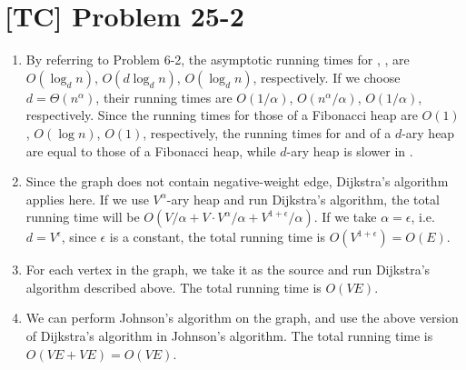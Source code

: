 \documentclass[a4paper,11pt,twocolumn]{article}
\begin{document}
  \section{[TC] Problem 25-2}
  \begin{enumerate}
  	\item By referring to Problem 6-2, the asymptotic running times for , ,  are $O(\log_d n)$, $O(d \log_d n)$, $O(\log_d n )$, respectively. If we choose $d = \Theta(n^{\alpha})$, their running times are $O(1/\alpha)$, $O(n^{\alpha}/\alpha)$, $O(1/\alpha)$, respectively. Since the running times for those of a Fibonacci heap are $O(1)$, $O(\log n)$, $O(1)$, respectively, the running times for  and  of a $d$-ary heap are equal to those of a Fibonacci heap, while $d$-ary heap is slower in .
    \item Since the graph does not contain negative-weight edge, Dijkstra's algorithm applies here. If we use $V^{\alpha}$-ary heap and run Dijkstra's algorithm, the total running time will be $O(V / \alpha + V \cdot V^{\alpha}/\alpha + V^{1 + \epsilon}/\alpha)$. If we take $\alpha = \epsilon$, i.e. $d = V^{\epsilon}$, since $\epsilon$ is a constant, the total running time is $O(V^{1+\epsilon}) = O(E)$.
    \item For each vertex in the graph, we take it as the source and run Dijkstra's algorithm described above. The total running time is $O(VE)$.
    \item We can perform Johnson's algorithm on the graph, and use the above version of Dijkstra's algorithm in Johnson's algorithm. The total running time is $O(VE + VE) = O(VE)$.
  \end{enumerate}
\end{document}
